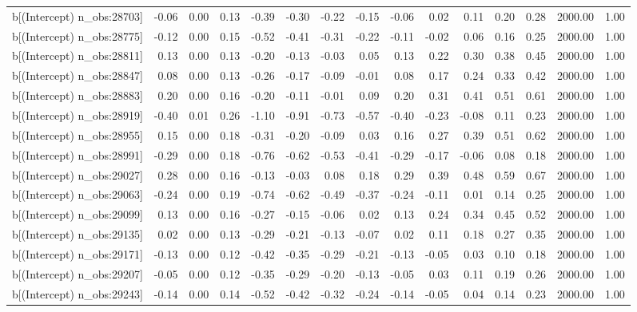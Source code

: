 \begin{table}[ht]
\begin{tabular}{rrrrrrrrrrrrrrr}
  b[(Intercept) n\_obs:28703] & -0.06 & 0.00 & 0.13 & -0.39 & -0.30 & -0.22 & -0.15 & -0.06 & 0.02 & 0.11 & 0.20 & 0.28 & 2000.00 & 1.00 \\ 
  b[(Intercept) n\_obs:28775] & -0.12 & 0.00 & 0.15 & -0.52 & -0.41 & -0.31 & -0.22 & -0.11 & -0.02 & 0.06 & 0.16 & 0.25 & 2000.00 & 1.00 \\ 
  b[(Intercept) n\_obs:28811] & 0.13 & 0.00 & 0.13 & -0.20 & -0.13 & -0.03 & 0.05 & 0.13 & 0.22 & 0.30 & 0.38 & 0.45 & 2000.00 & 1.00 \\ 
  b[(Intercept) n\_obs:28847] & 0.08 & 0.00 & 0.13 & -0.26 & -0.17 & -0.09 & -0.01 & 0.08 & 0.17 & 0.24 & 0.33 & 0.42 & 2000.00 & 1.00 \\ 
  b[(Intercept) n\_obs:28883] & 0.20 & 0.00 & 0.16 & -0.20 & -0.11 & -0.01 & 0.09 & 0.20 & 0.31 & 0.41 & 0.51 & 0.61 & 2000.00 & 1.00 \\ 
  b[(Intercept) n\_obs:28919] & -0.40 & 0.01 & 0.26 & -1.10 & -0.91 & -0.73 & -0.57 & -0.40 & -0.23 & -0.08 & 0.11 & 0.23 & 2000.00 & 1.00 \\ 
  b[(Intercept) n\_obs:28955] & 0.15 & 0.00 & 0.18 & -0.31 & -0.20 & -0.09 & 0.03 & 0.16 & 0.27 & 0.39 & 0.51 & 0.62 & 2000.00 & 1.00 \\ 
  b[(Intercept) n\_obs:28991] & -0.29 & 0.00 & 0.18 & -0.76 & -0.62 & -0.53 & -0.41 & -0.29 & -0.17 & -0.06 & 0.08 & 0.18 & 2000.00 & 1.00 \\ 
  b[(Intercept) n\_obs:29027] & 0.28 & 0.00 & 0.16 & -0.13 & -0.03 & 0.08 & 0.18 & 0.29 & 0.39 & 0.48 & 0.59 & 0.67 & 2000.00 & 1.00 \\ 
  b[(Intercept) n\_obs:29063] & -0.24 & 0.00 & 0.19 & -0.74 & -0.62 & -0.49 & -0.37 & -0.24 & -0.11 & 0.01 & 0.14 & 0.25 & 2000.00 & 1.00 \\ 
  b[(Intercept) n\_obs:29099] & 0.13 & 0.00 & 0.16 & -0.27 & -0.15 & -0.06 & 0.02 & 0.13 & 0.24 & 0.34 & 0.45 & 0.52 & 2000.00 & 1.00 \\ 
  b[(Intercept) n\_obs:29135] & 0.02 & 0.00 & 0.13 & -0.29 & -0.21 & -0.13 & -0.07 & 0.02 & 0.11 & 0.18 & 0.27 & 0.35 & 2000.00 & 1.00 \\ 
  b[(Intercept) n\_obs:29171] & -0.13 & 0.00 & 0.12 & -0.42 & -0.35 & -0.29 & -0.21 & -0.13 & -0.05 & 0.03 & 0.10 & 0.18 & 2000.00 & 1.00 \\ 
  b[(Intercept) n\_obs:29207] & -0.05 & 0.00 & 0.12 & -0.35 & -0.29 & -0.20 & -0.13 & -0.05 & 0.03 & 0.11 & 0.19 & 0.26 & 2000.00 & 1.00 \\ 
  b[(Intercept) n\_obs:29243] & -0.14 & 0.00 & 0.14 & -0.52 & -0.42 & -0.32 & -0.24 & -0.14 & -0.05 & 0.04 & 0.14 & 0.23 & 2000.00 & 1.00 \\ 

\end{tabular}
\end{table}
